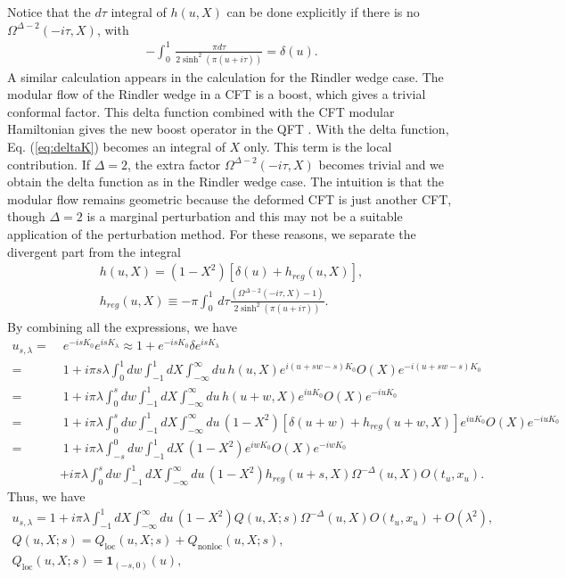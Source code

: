 \documentclass[a4paper,11pt]{article}
\theoremstyle{definition}
\begin{document}
Notice that the $d\tau$ integral of $h(u,X)$ can be done explicitly if there is no $\Omega^{\Delta-2}(-i\tau,X)$, with
\begin{align}
    -\int_0^1\, \frac{ \pi d\tau }{2\sinh^2(\pi (u+i\tau))} = \delta(u).
\end{align}
A similar calculation appears in the calculation for the Rindler wedge case. The modular flow of the Rindler wedge in a CFT is a boost, which gives a trivial conformal factor. This delta function combined with the CFT modular Hamiltonian gives the new boost operator in the QFT \cite{}. With the delta function, Eq. (\ref{eq:deltaK}) becomes an integral of $X$ only. This term is the local contribution.  If $\Delta = 2$, the extra factor $\Omega^{\Delta-2}(-i\tau,X)$ becomes trivial and we obtain the delta function as in the Rindler wedge case. The intuition is that the modular flow remains geometric because the deformed CFT is just another CFT, though $\Delta = 2$ is a marginal perturbation and this may not be a suitable application of the perturbation method. For these reasons, we separate the divergent part from the integral
\begin{gather}
    h(u,X) =  (1-X^2)\left[\delta(u) + h_{reg}(u,X)\right], \\
    h_{reg}(u,X) \equiv -\pi\int_0^1\, d\tau \frac{ (\Omega^{\Delta-2}(-i\tau,X) -1)}{2\sinh^2(\pi (u+i\tau))} .
\end{gather}
By combining all the expressions, we have
\begin{align}
    u_{s,\lambda} =&\; e^{-isK_0}e^{isK_\lambda} \approx 1 + e^{-isK_0}\delta e^{isK_\lambda}\\
    =&\; 1 + i\pi s\lambda\int_0^1 dw  \int_{-1}^1 dX \int_{-\infty}^{\infty} du \, h(u,X) e^{i(u+sw-s)K_0} O(X) e^{-i(u+sw-s)K_0} \\
    =&\; 1 + i\pi \lambda\int_0^s dw  \int_{-1}^1 dX \int_{-\infty}^{\infty} du \, h(u+w,X) e^{iuK_0} O(X) e^{-iuK_0} \\
    =&\; 1 + i\pi \lambda\int_0^s dw  \int_{-1}^1 dX \int_{-\infty}^{\infty} du \, (1-X^2)\left[\delta(u+w) + h_{reg}(u+w,X)\right] e^{iuK_0} O(X) e^{-iuK_0}\\
    =&\; 1 + i\pi \lambda\int_{-s}^0 dw  \int_{-1}^1 dX \, (1-X^2)e^{iwK_0} O(X) e^{-iwK_0} \nonumber\\
    &+ {i\pi \lambda}\int_0^s dw  \int_{-1}^1 dX \int_{-\infty}^{\infty} du \, (1-X^2)h_{reg}(u+s,X) \Omega^{-\Delta}(u,X)O(t_u,x_u).
\end{align}
Thus, we have
\begin{gather}
    u_{s,\lambda} = 1 + i\pi \lambda \int_{-1}^1 dX \int_{-\infty}^{\infty} du \, (1-X^2) Q(u,X;s) \Omega^{-\Delta}(u,X) O(t_u,x_u) +O(\lambda^2),\\
    Q(u,X;s) = Q_{\text{loc}}(u,X;s) + Q_{\text{nonloc}}(u,X;s),\\
    Q_{\text{loc}}(u,X;s) =  \textbf{1}_{(-s,0)}(u),
\end{gather}
\end{document}
